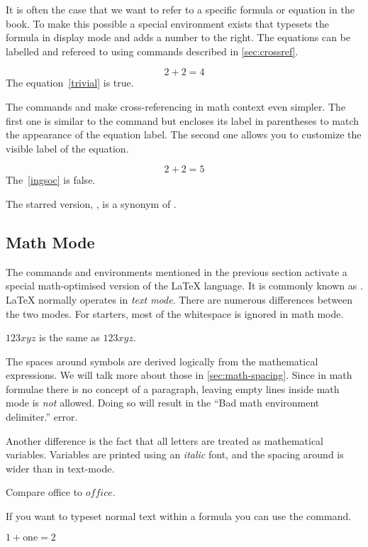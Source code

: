 It is often the case that we want to refer to a specific formula or equation in
the book. To make this possible a special  environment exists that
typesets the formula in display mode and adds a number to the right. The
equations can be labelled and refereed to using commands described in
\autoref{sec:crossref}.
\begin{example}
\begin{equation}
  \label{trivial}
  2 + 2 = 4
\end{equation}
The equation~\ref{trivial}
is true.
\end{example}
The commands  and  make cross-referencing in math context
even simpler. The first one is similar to the  command but encloses its
label in parentheses to match the appearance of the equation label. The second
one allows you to customize the visible label of the equation.
\begin{example}
\begin{equation}
  \tag{Ingsoc's theorem}
  \label{ingsoc}
  2 + 2 = 5
\end{equation}
The~\eqref{ingsoc} is false.
\end{example}
The starred version, , is a synonym of \csi{[}.

\subsection{Math Mode}

The commands and environments mentioned in the previous section activate a
special math-optimised version of the \LaTeX{} language. It is commonly known
as \emph{}. \LaTeX{} normally operates in \emph{text mode}. There
are numerous differences between the two modes. For starters, most of the
whitespace is ignored in math mode.
\begin{example}
\(123xyz\) is the same as \(
  1 2 3 x y z
\).
\end{example}
The spaces around symbols are derived logically from the mathematical
expressions. We will talk more about those in \autoref{sec:math-spacing}. Since
in math formulae there is no concept of a paragraph, leaving empty lines inside
math mode is \emph{not} allowed. Doing so will result in the \enquote{Bad math
  environment delimiter.} error.

Another difference is the fact that all letters are treated as mathematical
variables. Variables are printed using an \textit{italic} font, and the
spacing around is wider than in text-mode.
\begin{example}
Compare office to \(office\).
\end{example}
If you want to typeset normal text within a formula you can use the 
command.
\begin{example}
\( 1 + \text{one} = 2\)
\end{example}

